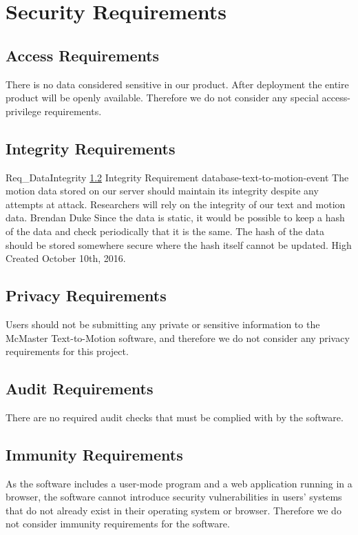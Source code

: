\documentclass{scrreprt}
\begin{document}
\section{Security Requirements}

\subsection{Access Requirements}

There is no data considered sensitive in our product. After deployment the
entire product will be openly available. Therefore we do not consider any
special access-privilege requirements.

\subsection{Integrity Requirements}
\label{req-integrity}

\requirement
{Req_DataIntegrity}
{\ref{req-integrity} Integrity Requirement}
{database-text-to-motion-event}
{The motion data stored on our server should maintain its integrity despite any
attempts at attack.}
{Researchers will rely on the integrity of our text and motion data.}
{Brendan Duke}
{Since the data is static, it would be possible to keep a hash of the data and
check periodically that it is the same. The hash of the data should be stored
somewhere secure where the hash itself cannot be updated.}
{High}
{Created October 10th, 2016.}

\subsection{Privacy Requirements}

Users should not be submitting any private or sensitive information to the
McMaster Text-to-Motion software, and therefore we do not consider any privacy
requirements for this project.

\subsection{Audit Requirements}

There are no required audit checks that must be complied with by the software.

\subsection{Immunity Requirements}

As the software includes a user-mode program and a web application running in a
browser, the software cannot introduce security vulnerabilities in users'
systems that do not already exist in their operating system or browser.
Therefore we do not consider immunity requirements for the software.
\end{document}
